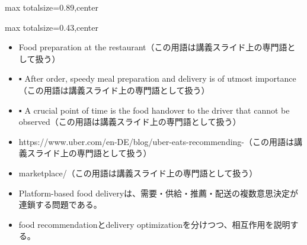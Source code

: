 \begin{minipage}[t]{0.58\textwidth}
\begin{adjustbox}{max totalsize={\textwidth}{0.89\textheight},center}
\begin{minipage}{\textwidth}
\end{minipage}
\end{adjustbox}
\end{minipage}


\clearpage
{}
\begin{minipage}[t]{0.405\textwidth}
\begin{adjustbox}{max totalsize={\textwidth}{0.43\textheight},center}
\begin{minipage}{\textwidth}\scriptsize
{}\begin{itemize}
\item Food preparation at the restaurant（この用語は講義スライド上の専門語として扱う）
\item ▪ After order, speedy meal preparation and delivery is of utmost importance（この用語は講義スライド上の専門語として扱う）
\item ▪ A crucial point of time is the food handover to the driver that cannot be observed（この用語は講義スライド上の専門語として扱う）
\item https://www.uber.com/en-DE/blog/uber-eats-recommending-（この用語は講義スライド上の専門語として扱う）
\item marketplace/（この用語は講義スライド上の専門語として扱う）
\end{itemize}\begin{itemize}
\item Platform-based food deliveryは、需要・供給・推薦・配送の複数意思決定が連鎖する問題である。
\item food recommendationとdelivery optimizationを分けつつ、相互作用を説明する。
\end{itemize}
\end{minipage}
\end{adjustbox}
\end{minipage}\hfill
